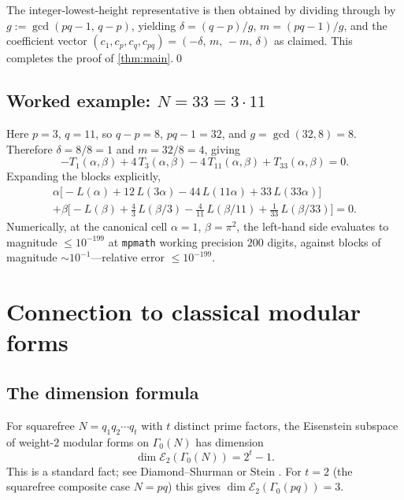 \documentclass[11pt,reqno]{amsart}
\theoremstyle{definition}
\newcommand{\Eis}{\mathcal{E}}
\begin{document}
The integer-lowest-height representative is then obtained by dividing
through by $g := \gcd(pq-1,\, q-p)$, yielding $\delta = (q-p)/g$,
$m = (pq-1)/g$, and the coefficient vector
$(c_1, c_p, c_q, c_{pq}) = (-\delta,\, m,\, -m,\, \delta)$ as
claimed. This completes the proof of \cref{thm:main}.\qed

\subsection{Worked example: $N = 33 = 3 \cdot 11$}

Here $p = 3$, $q = 11$, so $q - p = 8$, $pq - 1 = 32$, and
$g = \gcd(32, 8) = 8$. Therefore $\delta = 8/8 = 1$ and $m = 32/8 = 4$,
giving
\begin{equation}\label{eq:N33}
-T_1(\alpha,\beta) + 4\, T_3(\alpha,\beta)
- 4\, T_{11}(\alpha,\beta) + T_{33}(\alpha,\beta) = 0.
\end{equation}
Expanding the blocks explicitly,
\begin{multline*}
\alpha\bigl[-L(\alpha) + 12\,L(3\alpha) - 44\,L(11\alpha)
+ 33\,L(33\alpha)\bigr]\\
+ \beta\bigl[-L(\beta) + \tfrac{4}{3}\,L(\beta/3)
- \tfrac{4}{11}\,L(\beta/11) + \tfrac{1}{33}\,L(\beta/33)\bigr] = 0.
\end{multline*}
Numerically, at the canonical cell $\alpha = 1$, $\beta = \pi^2$, the
left-hand side evaluates to magnitude $\le 10^{-199}$ at
\texttt{mpmath} working precision $200$ digits, against blocks of
magnitude $\sim 10^{-1}$---relative error $\le 10^{-199}$.

\section{Connection to classical modular forms}\label{sec:modular}

\subsection{The dimension formula}

For squarefree $N = q_1 q_2 \cdots q_t$ with $t$ distinct prime
factors, the Eisenstein subspace of weight-$2$ modular forms on
$\Gamma_0(N)$ has dimension
\begin{equation}\label{eq:dim}
\dim \Eis_2(\Gamma_0(N)) = 2^t - 1.
\end{equation}
This is a standard fact; see Diamond--Shurman \cite[\S3.5]{DiamondShurman}
or Stein \cite[Ch.~5]{Stein}. For $t = 2$ (the squarefree composite
case $N = pq$) this gives $\dim \Eis_2(\Gamma_0(pq)) = 3$.
\end{document}
